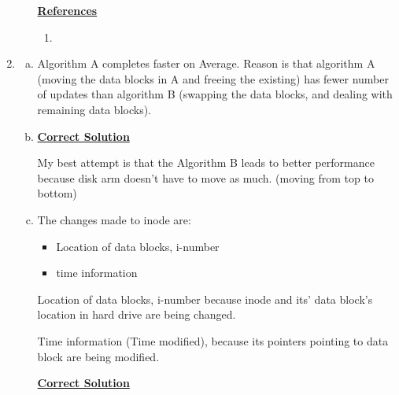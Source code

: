 \documentclass[12pt]{article}
\begin{document}
\begin{enumerate}[1.]
\begin{enumerate}[a)]
        \bigskip

        \underline{\textbf{References}}

        \begin{enumerate}[1)]
            \item
        \end{enumerate}

    \end{enumerate}

    \item

    \bigskip

    \begin{enumerate}[a)]
        \item Algorithm A completes faster on Average. Reason is that
        algorithm A (moving the data blocks in A and freeing the existing) has
        fewer number of updates than algorithm B (swapping the data blocks, and dealing with remaining data blocks).
        \item

        \begin{mdframed}
        \underline{\textbf{Correct Solution}}

        \color{red}My best attempt is that the Algorithm B leads to better performance
        because disk arm doesn't have to move as much. (moving from top to bottom)\color{black}

        \end{mdframed}
        \item

        The changes made to inode are:

        \begin{itemize}
            \item Location of data blocks, i-number
            \item time information
        \end{itemize}
        \bigskip

        Location of data blocks, i-number because inode and its' data block's
        location in hard drive are being changed.

        \bigskip

        Time information (Time modified), because its pointers pointing to data block are being modified.

        \bigskip

        \begin{mdframed}
        \underline{\textbf{Correct Solution}}


\end{mdframed}
\end{enumerate}
\end{enumerate}
\end{document}
